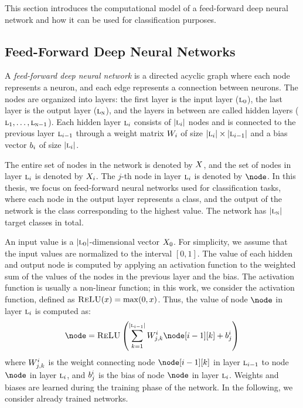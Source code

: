 This section introduces the computational model of a feed-forward deep neural network and how it can be used for classification purposes.
\subsection{Feed-Forward Deep Neural Networks}

A \emph{feed-forward deep neural network} is a directed acyclic graph where each node represents a neuron, and each edge represents a connection between neurons. The nodes are organized into layers: the first layer is the input layer ($\textup{\textsc{l}}_0$), the last layer is the output layer ($\textup{\textsc{l}}_{\textup{\textsc{n}}}$), and the layers in between are called hidden layers ($\textup{\textsc{l}}_{1},\ldots,\textup{\textsc{l}}_{\textup{\textsc{n}}-1}$). Each hidden layer $\textup{\textsc{l}}_{i}$ consists of $|\textup{\textsc{l}}_{i}|$ nodes and is connected to the previous layer $\textup{\textsc{l}}_{i-1}$ through a weight matrix $W_{i}$ of size $|\textup{\textsc{l}}_{i}|\times|\textup{\textsc{l}}_{i-1}|$ and a bias vector $b_{i}$ of size $|\textup{\textsc{l}}_{i}|$.

The entire set of nodes in the network is denoted by $X$, and the set of nodes in layer $\textup{\textsc{l}}_{i}$ is denoted by $X_{i}$. The $j$-th node in layer $\textup{\textsc{l}}_{i}$ is denoted by $\node$. In this thesis, we focus on feed-forward neural networks used for classification tasks, where each node in the output layer represents a class, and the output of the network is the class corresponding to the highest value. The network has $|\textup{\textsc{l}}_{\textup{\textsc{n}}}|$ target classes in total.

An input value is a $|\textup{\textsc{l}}_0|$-dimensional vector $X_{0}$. For simplicity, we assume that the input values are normalized to the interval $[0,1]$. The value of each hidden and output node is computed by applying an activation function to the weighted sum of the values of the nodes in the previous layer and the bias. The activation function is usually a non-linear function; in this work, we consider the \relu{} activation function, defined as $\textsc{ReLU}(x) = \max(0, x)$. Thus, the value of node $\node$ in layer $\textup{\textsc{l}}_{i}$ is computed as:
\begin{align*}
\node = \relu\left(
\sum_{k=1}^{\cardinalitynospaces{\hiddenlayer{i-1}}} \weight_{j,k}^{i} \node[i-1][k] + \bias_{j}^{i}
\right)
\end{align*}
where $W_{j,k}^{i}$ is the weight connecting node $\node[i-1][k]$ in layer $\textup{\textsc{l}}_{i-1}$ to node $\node$ in layer $\textup{\textsc{l}}_{i}$, and $b_{j}^{i}$ is the bias of node $\node$ in layer $\textup{\textsc{l}}_{i}$. Weights and biases are learned during the training phase of the network. In the following, we consider already trained networks.

